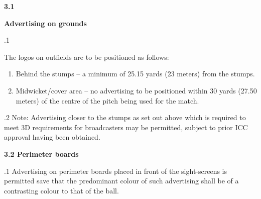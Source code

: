 \documentclass[12pt]{article}
\begin{document}
\vspace{\baselineskip}
{\fontsize{11pt}{13.2pt}\selectfont \textbf{3.1 \tabto{0.47in} }{\fontsize{10pt}{12.0pt}\selectfont \textbf{Advertising on grounds}\par}\par}\par


\vspace{\baselineskip}
{\fontsize{9pt}{10.8pt}.1 \tabto{0.49in} {\fontsize{8pt}{9.6pt}\selectfont The logos on outfields are to be positioned as follows:\par}\par}\par


\vspace{\baselineskip}
\begin{enumerate}
	\item {\fontsize{9pt}{10.8pt}\selectfont Behind the stumps – a minimum of 25.15 yards (23 meters) from the stumps.\par}\par


\vspace{\baselineskip}
	\item {\fontsize{9pt}{10.8pt}\selectfont Midwicket/cover area – no advertising to be positioned within 30 yards (27.50 meters) of the centre of the pitch being used for the match.\par}
\end{enumerate}\par


\vspace{\baselineskip}
\begin{adjustwidth}{0.5in}{0.38in}
{\fontsize{9pt}{10.8pt}.2 \tabto{0.49in} Note: Advertising closer to the stumps as set out above which is required to meet 3D requirements for broadcasters may be permitted, subject to prior ICC approval having been obtained.\par}\par

\end{adjustwidth}


\vspace{\baselineskip}
{\fontsize{11pt}{13.2pt}\selectfont \textbf{3.2 \tabto{0.47in} Perimeter boards}\par}\par


\vspace{\baselineskip}
\begin{adjustwidth}{0.5in}{0.12in}
{\fontsize{9pt}{10.8pt}.1 \tabto{0.49in} Advertising on perimeter boards placed in front of the sight-screens is permitted save that the predominant colour of such advertising shall be of a contrasting colour to that of the ball.\par}\par

\end{adjustwidth}
\end{document}
